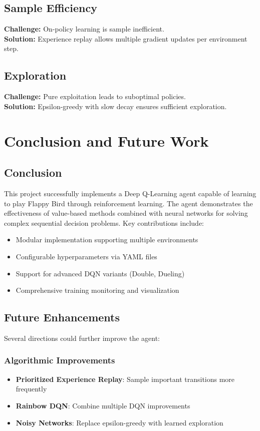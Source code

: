 \documentclass[12pt,a4paper]{article}
\begin{document}
\subsection{Sample Efficiency}
\textbf{Challenge:} On-policy learning is sample inefficient.
\\
\textbf{Solution:} Experience replay allows multiple gradient updates per environment step.

\subsection{Exploration}
\textbf{Challenge:} Pure exploitation leads to suboptimal policies.
\\
\textbf{Solution:} Epsilon-greedy with slow decay ensures sufficient exploration.

\section{Conclusion and Future Work}

\subsection{Conclusion}
This project successfully implements a Deep Q-Learning agent capable of learning to play Flappy Bird through reinforcement learning. The agent demonstrates the effectiveness of value-based methods combined with neural networks for solving complex sequential decision problems. Key contributions include:
\begin{itemize}
    \item Modular implementation supporting multiple environments
    \item Configurable hyperparameters via YAML files
    \item Support for advanced DQN variants (Double, Dueling)
    \item Comprehensive training monitoring and visualization
\end{itemize}

\subsection{Future Enhancements}
Several directions could further improve the agent:

\subsubsection{Algorithmic Improvements}
\begin{itemize}
    \item \textbf{Prioritized Experience Replay}: Sample important transitions more frequently
    \item \textbf{Rainbow DQN}: Combine multiple DQN improvements
    \item \textbf{Noisy Networks}: Replace epsilon-greedy with learned exploration
\end{itemize}
\end{document}
